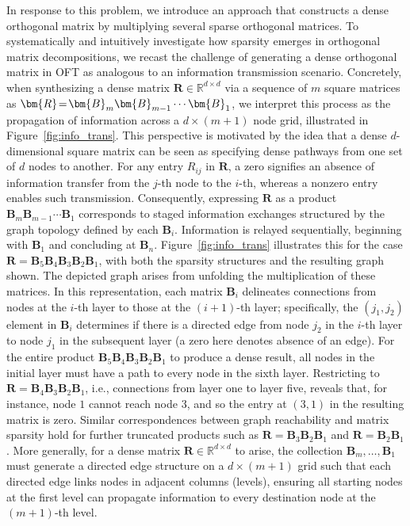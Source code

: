 In response to this problem, we introduce an approach that constructs a dense orthogonal matrix by multiplying several sparse orthogonal matrices. To systematically and intuitively investigate how sparsity emerges in orthogonal matrix decompositions, we recast the challenge of generating a dense orthogonal matrix in OFT as analogous to an information transmission scenario. Concretely, when synthesizing a dense matrix $\bm{R}\in\mathbb{R}^{d\times d}$ via a sequence of $m$ square matrices as $\thickmuskip=2mu \medmuskip=2mu \bm{R}=\bm{B}_m\bm{B}_{m-1}\cdots\bm{B}_1$, we interpret this process as the propagation of information across a $d\times (m+1)$ node grid, illustrated in Figure~\ref{fig:info_trans}. This perspective is motivated by the idea that a dense $d$-dimensional square matrix can be seen as specifying dense pathways from one set of $d$ nodes to another. For any entry $R_{ij}$ in $\bm{R}$, a zero signifies an absence of information transfer from the $j$-th node to the $i$-th, whereas a nonzero entry enables such transmission. Consequently, expressing $\bm{R}$ as a product $\bm{B}_m\bm{B}_{m-1}\cdots\bm{B}_1$ corresponds to staged information exchanges structured by the graph topology defined by each $\bm{B}_i$. Information is relayed sequentially, beginning with $\bm{B}_1$ and concluding at $\bm{B}_n$. Figure~\ref{fig:info_trans} illustrates this for the case $\bm{R}=\bm{B}_5\bm{B}_4\bm{B}_3\bm{B}_2\bm{B}_1$, with both the sparsity structures and the resulting graph shown. The depicted graph arises from unfolding the multiplication of these matrices. In this representation, each matrix $\bm{B}_i$ delineates connections from nodes at the $i$-th layer to those at the $(i+1)$-th layer; specifically, the $(j_1, j_2)$ element in $\bm{B}_i$ determines if there is a directed edge from node $j_2$ in the $i$-th layer to node $j_1$ in the subsequent layer (a zero here denotes absence of an edge). For the entire product $\bm{B}_5\bm{B}_4\bm{B}_3\bm{B}_2\bm{B}_1$ to produce a dense result, all nodes in the initial layer must have a path to every node in the sixth layer. Restricting to $\bm{R}=\bm{B}_4\bm{B}_3\bm{B}_2\bm{B}_1$, i.e., connections from layer one to layer five, reveals that, for instance, node $1$ cannot reach node $3$, and so the entry at $(3,1)$ in the resulting matrix is zero. Similar correspondences between graph reachability and matrix sparsity hold for further truncated products such as $\bm{R}=\bm{B}_3\bm{B}_2\bm{B}_1$ and $\bm{R}=\bm{B}_2\bm{B}_1$. More generally, for a dense matrix $\bm{R}\in\mathbb{R}^{d\times d}$ to arise, the collection $\bm{B}_m,\ldots,\bm{B}_1$ must generate a directed edge structure on a $d\times(m+1)$ grid such that each directed edge links nodes in adjacent columns (levels), ensuring all starting nodes at the first level can propagate information to every destination node at the $(m+1)$-th level.

